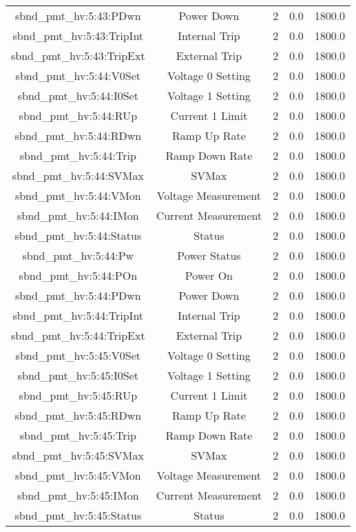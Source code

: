 \begin{center}
\begin{longtable}{c | c c c c }
sbnd\_pmt\_hv:5:43:PDwn & Power Down & 2 & 0.0 & 1800.0\\ 
sbnd\_pmt\_hv:5:43:TripInt & Internal Trip & 2 & 0.0 & 1800.0\\ 
sbnd\_pmt\_hv:5:43:TripExt & External Trip & 2 & 0.0 & 1800.0\\ 
sbnd\_pmt\_hv:5:44:V0Set & Voltage 0 Setting & 2 & 0.0 & 1800.0\\ 
sbnd\_pmt\_hv:5:44:I0Set & Voltage 1 Setting & 2 & 0.0 & 1800.0\\ 
sbnd\_pmt\_hv:5:44:RUp & Current 1 Limit & 2 & 0.0 & 1800.0\\ 
sbnd\_pmt\_hv:5:44:RDwn & Ramp Up Rate & 2 & 0.0 & 1800.0\\ 
sbnd\_pmt\_hv:5:44:Trip & Ramp Down Rate & 2 & 0.0 & 1800.0\\ 
sbnd\_pmt\_hv:5:44:SVMax & SVMax & 2 & 0.0 & 1800.0\\ 
sbnd\_pmt\_hv:5:44:VMon & Voltage Measurement & 2 & 0.0 & 1800.0\\ 
sbnd\_pmt\_hv:5:44:IMon & Current Measurement & 2 & 0.0 & 1800.0\\ 
sbnd\_pmt\_hv:5:44:Status & Status & 2 & 0.0 & 1800.0\\ 
sbnd\_pmt\_hv:5:44:Pw & Power Status & 2 & 0.0 & 1800.0\\ 
sbnd\_pmt\_hv:5:44:POn & Power On & 2 & 0.0 & 1800.0\\ 
sbnd\_pmt\_hv:5:44:PDwn & Power Down & 2 & 0.0 & 1800.0\\ 
sbnd\_pmt\_hv:5:44:TripInt & Internal Trip & 2 & 0.0 & 1800.0\\ 
sbnd\_pmt\_hv:5:44:TripExt & External Trip & 2 & 0.0 & 1800.0\\ 
sbnd\_pmt\_hv:5:45:V0Set & Voltage 0 Setting & 2 & 0.0 & 1800.0\\ 
sbnd\_pmt\_hv:5:45:I0Set & Voltage 1 Setting & 2 & 0.0 & 1800.0\\ 
sbnd\_pmt\_hv:5:45:RUp & Current 1 Limit & 2 & 0.0 & 1800.0\\ 
sbnd\_pmt\_hv:5:45:RDwn & Ramp Up Rate & 2 & 0.0 & 1800.0\\ 
sbnd\_pmt\_hv:5:45:Trip & Ramp Down Rate & 2 & 0.0 & 1800.0\\ 
sbnd\_pmt\_hv:5:45:SVMax & SVMax & 2 & 0.0 & 1800.0\\ 
sbnd\_pmt\_hv:5:45:VMon & Voltage Measurement & 2 & 0.0 & 1800.0\\ 
sbnd\_pmt\_hv:5:45:IMon & Current Measurement & 2 & 0.0 & 1800.0\\ 
sbnd\_pmt\_hv:5:45:Status & Status & 2 & 0.0 & 1800.0\\ 

\end{longtable}
\end{center}
